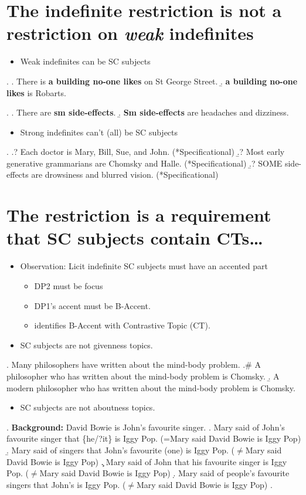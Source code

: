 \documentclass[GPFinal]{subfiles}
\begin{document}
\section{The indefinite restriction is not a restriction on \textit{weak} indefinites}
\begin{itemize}
	\item Weak indefinites can be SC subjects
\end{itemize}
\ex. 
\a. There is \textbf{a building no-one likes} on St George Street.
\b. \textbf{a building no-one likes} is Robarts.

\ex.
\a. There are \textbf{sm side-effects}.
\b. \textbf{Sm side-effects} are headaches and dizziness. 

\begin{itemize}
	\item Strong indefinites can't (all) be SC subjects 
\end{itemize}
\ex.
\a.? Each doctor is Mary, Bill, Sue, and John. (*Specificational)
\b.? Most early generative grammarians are Chomsky and Halle. (*Specificational)
\b.? SOME side-effects are drowsiness and blurred vision. (*Specificational)

\section{The restriction is a requirement that SC subjects contain CTs\ldots}
\begin{itemize}
  \item Observation: Licit indefinite SC subjects must have an accented part
    \begin{itemize}
      \item DP2 must be focus
      \item DP1's accent must be  B-Accent.
      \item \textcite{buring2003d} identifies B-Accent with Contrastive Topic (CT).
    \end{itemize}
  \item SC subjects are not givenness topics.
\end{itemize}
\ex. Many philosophers have written about the mind-body problem.
\a.\# A philosopher who has written about the mind-body problem is Chomsky.
\b. A modern philosopher who has written about the mind-body problem is Chomsky.

\begin{itemize}
  \item SC subjects are not aboutness topics.
\end{itemize}
\ex. \textbf{Background:} David Bowie is John's favourite singer.
\a. Mary said of John's favourite singer that \{he/?it\} is Iggy Pop. (=Mary said David Bowie is Iggy Pop)
\b. Mary said of singers that John's favourite (one) is Iggy Pop. ($\neq$Mary said David Bowie is Iggy Pop)
\c. Mary said of John that his favourite singer is Iggy Pop. ($\neq$Mary said David Bowie is Iggy Pop)
\d. Mary said of people's favourite singers that John's is Iggy Pop. ($\neq$Mary said David Bowie is Iggy Pop)
\z.
\end{document}
